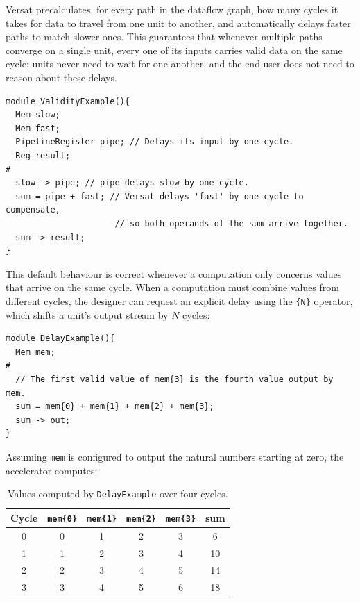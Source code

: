 %

Versat precalculates, for every path in the dataflow graph, how many cycles
it takes for data to travel from one unit to another, and automatically
delays faster paths to match slower ones. This guarantees that whenever
multiple paths converge on a single unit, every one of its inputs carries
valid data on the same cycle; units never need to wait for one another, and
the end user does not need to reason about these delays.

\begin{lstlisting}[language=VersatSpec,caption={Versat automatically balances the two paths reaching \texttt{sum}.},label={lst:validity_example}]
module ValidityExample(){
  Mem slow;
  Mem fast;
  PipelineRegister pipe; // Delays its input by one cycle.
  Reg result;
#
  slow -> pipe; // pipe delays slow by one cycle.
  sum = pipe + fast; // Versat delays 'fast' by one cycle to compensate,
                      // so both operands of the sum arrive together.
  sum -> result;
}
\end{lstlisting}

This default behaviour is correct whenever a computation only concerns
values that arrive on the same cycle. When a computation must combine
values from different cycles, the designer can request an explicit delay
using the \texttt{\{N\}} operator, which shifts a unit's output stream by
$N$ cycles:

\begin{lstlisting}[language=VersatSpec,caption={Explicit delay operator \texttt{\{N\}} combining values from different cycles.},label={lst:delay_example}]
module DelayExample(){
  Mem mem;
#
  // The first valid value of mem{3} is the fourth value output by mem.
  sum = mem{0} + mem{1} + mem{2} + mem{3};
  sum -> out;
}
\end{lstlisting}

Assuming \texttt{mem} is configured to output the natural numbers starting
at zero, the accelerator computes:

\begin{table}[H]
\centering
\begin{tabular}{|c|c|c|c|c|c|}
\hline
\rowcolor{iob-green}
\textbf{Cycle} & \texttt{mem\{0\}} & \texttt{mem\{1\}} & \texttt{mem\{2\}} & \texttt{mem\{3\}} & \textbf{sum} \\
\hline
0 & 0 & 1 & 2 & 3 & 6 \\
1 & 1 & 2 & 3 & 4 & 10 \\
2 & 2 & 3 & 4 & 5 & 14 \\
3 & 3 & 4 & 5 & 6 & 18 \\
\hline
\end{tabular}
\caption{Values computed by \texttt{DelayExample} over four cycles.}
\label{tab:data_validity}
\end{table}
